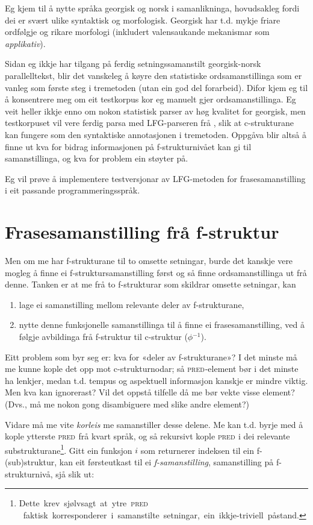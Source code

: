 \documentclass[11pt,a4paper,oneside,draft]{book}
\newcommand{\F}[2]{\textsc{#1}\ensuremath{_{#2}}}
\newcommand{\PRED}{\F{pred}{}}
\begin{document}
Eg kjem til å nytte språka georgisk og norsk i samanlikninga,
hovudsakleg fordi dei er svært ulike syntaktisk og morfologisk.
Georgisk har t.d. mykje friare ordfølgje og rikare morfologi
(inkludert valensaukande mekanismar som \emph{applikativ}). 

Sidan eg ikkje har tilgang på ferdig setningssamanstilt georgisk-norsk
parallelltekst, blir det vanskeleg å køyre den statistiske
ordsamanstillinga som er vanleg som første steg i tremetoden (utan
ein god del forarbeid). Difor kjem eg til å konsentrere meg om eit
testkorpus
kor eg manuelt gjer ordsamanstillinga. Eg veit heller ikkje enno om
nokon statistisk parser av høg kvalitet for georgisk, men testkorpuset
vil vere ferdig parsa med LFG-parseren frå \citet{meurer2008cgg}, slik
at c-strukturane kan fungere som den syntaktiske annotasjonen i
tremetoden. Oppgåva blir altså å finne ut kva for bidrag informasjonen
på f-strukturnivået kan gi til samanstillinga, og kva for problem ein
støyter på.

Eg vil prøve å implementere testversjonar av LFG-metoden for
frasesamanstilling i eit passande programmeringsspråk.

\section{Frasesamanstilling frå f-struktur}
\label{sec-1.2}

Men om me har f-strukturane til to omsette setningar, burde det
kanskje vere mogleg å finne ei f-struktursamanstilling først og så
finne ordsamanstillinga ut frå denne. Tanken er at me frå to
f-strukturar som skildrar omsette setningar, kan
\begin{enumerate}
\item lage ei samanstilling mellom relevante deler av f-strukturane,
\item nytte denne funksjonelle samanstillinga til å finne ei
   frasesamanstilling, ved å følgje avbildinga frå f-struktur til
   c-struktur ($\phi{}^{-1}$).
\end{enumerate}
Eitt problem som byr seg er: kva for «deler av f-strukturane»? I det
minste må me kunne kople det opp mot c-strukturnodar; så \PRED-element
bør i det minste ha lenkjer, medan t.d. tempus og aspektuell
informasjon kanskje er mindre viktig. Men kva kan ignorerast? Vil det
oppstå tilfelle då me bør vekte visse element? (Dvs., må me nokon gong
disambiguere med slike andre element?)

Vidare må me vite \emph{korleis} me samanstiller desse delene. Me kan
t.d. byrje med å kople ytterste \PRED{} frå kvart språk, og så
rekursivt kople \PRED{} i dei relevante
substrukturane\footnote{Dette~krev~sjølvsagt~at~ytre~\PRED{}~faktisk~korresponderer~i~samanstilte~setningar,~ein~ikkje-triviell~påstand.}. Gitt
ein funksjon $i$ som returnerer indeksen til ein f-(sub)struktur, kan
eit førsteutkast til ei \emph{f-samanstilling}, samanstilling på
f-strukturnivå, sjå slik ut:
\end{document}

